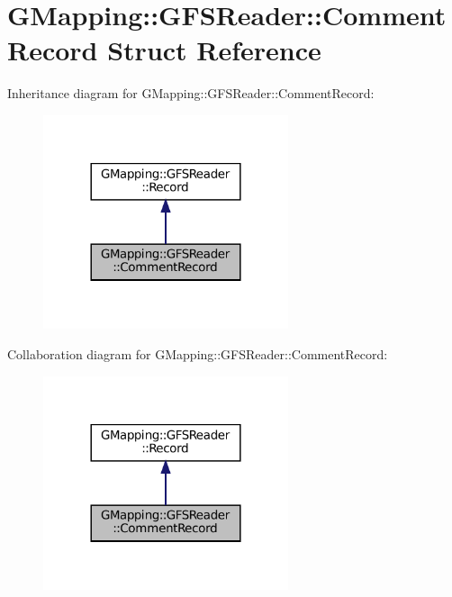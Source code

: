 \hypertarget{structGMapping_1_1GFSReader_1_1CommentRecord}{}\section{G\+Mapping\+:\+:G\+F\+S\+Reader\+:\+:Comment\+Record Struct Reference}
\label{structGMapping_1_1GFSReader_1_1CommentRecord}


Inheritance diagram for G\+Mapping\+:\+:G\+F\+S\+Reader\+:\+:Comment\+Record\+:
\nopagebreak
\begin{figure}[H]
\begin{center}
\leavevmode
\includegraphics[width=204pt]{structGMapping_1_1GFSReader_1_1CommentRecord__inherit__graph}
\end{center}
\end{figure}


Collaboration diagram for G\+Mapping\+:\+:G\+F\+S\+Reader\+:\+:Comment\+Record\+:
\nopagebreak
\begin{figure}[H]
\begin{center}
\leavevmode
\includegraphics[width=204pt]{structGMapping_1_1GFSReader_1_1CommentRecord__coll__graph}
\end{center}
\end{figure}
